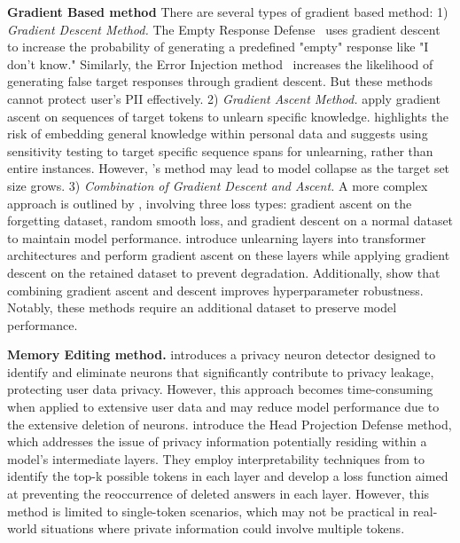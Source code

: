 \textbf{Gradient Based method}
There are several types of gradient based method:
1) \textit{Gradient Descent Method.} The Empty Response Defense~\citep{patil2023can,ouyang2022training} uses gradient descent to increase the probability of generating a predefined "empty" response like "I don’t know." Similarly, the Error Injection method~\citep{de2021editing} increases the likelihood of generating false target responses through gradient descent. But these methods cannot protect user's PII effectively.
2) \textit{Gradient Ascent Method.} \citet{jang2022knowledge} apply gradient ascent on sequences of target tokens to unlearn specific knowledge. \citet{wang2024selective} highlights the risk of embedding general knowledge within personal data and suggests using sensitivity testing to target specific sequence spans for unlearning, rather than entire instances. However, \citet{jang2022knowledge}'s method may lead to model collapse as the target set size grows.
3) \textit{Combination of Gradient Descent and Ascent.} A more complex approach is outlined by \citet{yao2023large}, involving three loss types: gradient ascent on the forgetting dataset, random smooth loss, and gradient descent on a normal dataset to maintain model performance. \citet{chen2023unlearn} introduce unlearning layers into transformer architectures and perform gradient ascent on these layers while applying gradient descent on the retained dataset to prevent degradation. Additionally, \citet{yao2024machine} show that combining gradient ascent and descent improves hyperparameter robustness. Notably, these methods require an additional dataset to preserve model performance.

\begin{comment}
There are several types of gradient based method: 1) \textbf{Gradient Descent method} including the Empty Response Defense~\citep{patil2023can,ouyang2022training} and Error Injection method~\citep{de2021editing}
2) \textbf{Gradient Ascent method} including the unlearning method~\citep{jang2022knowledge}, ~\citep{wang2024selective}
\end{comment}

\textbf{Memory Editing method.} \citet{wu2023depn} introduces a privacy neuron detector designed to identify and eliminate neurons that significantly contribute to privacy leakage, protecting user data privacy. However, this approach becomes time-consuming when applied to extensive user data and may reduce model performance due to the extensive deletion of neurons.
\citet{patil2023can} introduce the Head Projection Defense method, which addresses the issue of privacy information potentially residing within a model's intermediate layers. They employ interpretability techniques from \citet{geva2020transformer} to identify the top-k possible tokens in each layer and develop a loss function aimed at preventing the reoccurrence of deleted answers in each layer. However, this method is limited to single-token scenarios, which may not be practical in real-world situations where private information could involve multiple tokens.

